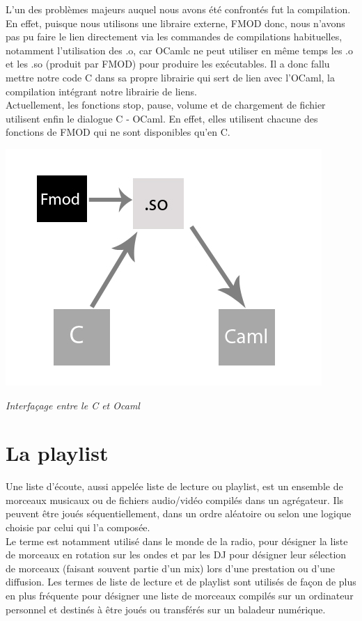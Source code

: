 \documentclass[12pt,a4paper]{report}
\begin{document}
L'un des problèmes majeurs auquel nous avons été confrontés fut la compilation. En effet, puisque nous utilisons une libraire externe, FMOD donc, nous n'avons pas pu faire le lien directement via les commandes de compilations habituelles, notamment l'utilisation des .o, car OCamlc ne peut utiliser en même temps les .o et les .so (produit par FMOD) pour produire les exécutables. Il a donc fallu mettre notre code C dans sa propre librairie qui sert de lien avec l'OCaml, la compilation intégrant notre librairie de liens.\\

Actuellement, les fonctions stop, pause, volume et de chargement de fichier utilisent enfin le dialogue C - OCaml. En effet, elles utilisent chacune des fonctions de FMOD qui ne sont disponibles qu'en C.\\

\begin{center}
\includegraphics[scale=0.7]{c_caml.jpg}

\it{Interfaçage entre le C et Ocaml}
\end{center}

\chapter{La playlist}

Une liste d'écoute, aussi appelée liste de lecture ou playlist, est un ensemble de morceaux musicaux ou de fichiers audio/vidéo compilés dans un agrégateur. Ils peuvent être joués séquentiellement, dans un ordre aléatoire ou selon une logique choisie par celui qui l'a composée.\\

Le terme est notamment utilisé dans le monde de la radio, pour désigner la liste de morceaux en rotation sur les ondes et par les DJ pour désigner leur sélection de morceaux (faisant souvent partie d'un mix) lors d'une prestation ou d'une diffusion.
Les termes de liste de lecture et de playlist sont utilisés de façon de plus en plus fréquente pour désigner une liste de morceaux compilés sur un ordinateur personnel et destinés à être joués ou transférés sur un baladeur numérique.
\end{document}
